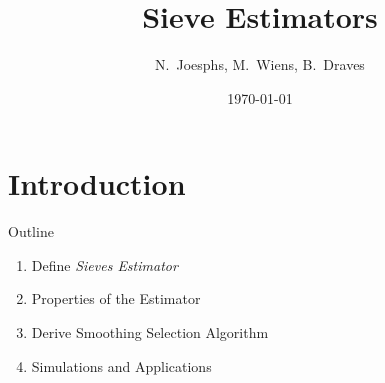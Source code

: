 \documentclass{beamer}
\title{Sieve Estimators}
\subtitle{}
\date{\today}
\author{N.~Joesphs, M.~Wiens, B.~Draves}
\begin{document}
\begin{frame}%
  \titlepage
\end{frame}

\section{Introduction} 

\begin{frame}{Outline} %
\begin{enumerate}
\item Define \textit{Sieves Estimator}
\item Properties of the Estimator
\item Derive Smoothing Selection Algorithm
\item Simulations and Applications 
\end{enumerate}
\end{frame}
\end{document}

